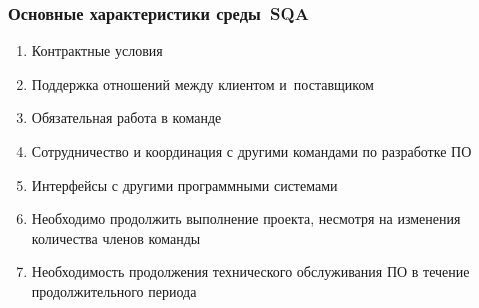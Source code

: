 \documentclass{../industrial-development}
\begin{document}
\begin{frame} \frametitle{Основные характеристики среды~SQA}
 	 \begin{enumerate}
\item Контрактные условия
\item Поддержка отношений между клиентом и~поставщиком
\item Обязательная работа в команде
\item Сотрудничество и координация с другими командами по разработке ПО
\item Интерфейсы с другими программными системами
\item Необходимо продолжить выполнение проекта, несмотря на изменения количества членов команды
\item Необходимость продолжения технического обслуживания ПО в течение продолжительного периода
  	\end{enumerate}
\end{frame}

\lecturenotes
\end{document}
